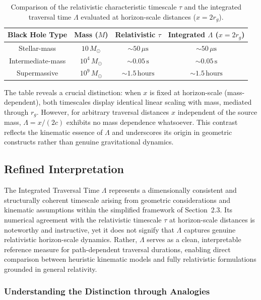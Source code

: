 \documentclass[12pt,a4paper]{article}
\begin{document}
\begin{table}[h!]
\centering
\begin{tabular}{|c|c|c|c|}
\hline
\textbf{Black Hole Type} & \textbf{Mass ($M$)} & \textbf{Relativistic $\tau$} & \textbf{Integrated $\Lambda$ ($x = 2r_g$)} \\
\hline
Stellar-mass & $10\,M_\odot$ & $\sim 50\,\mu\text{s}$ & $\sim 50\,\mu\text{s}$ \\
Intermediate-mass & $10^4\,M_\odot$ & $\sim 0.05\,\text{s}$ & $\sim 0.05\,\text{s}$ \\
Supermassive & $10^9\,M_\odot$ & $\sim 1.5\,\text{hours}$ & $\sim 1.5\,\text{hours}$ \\
\hline
\end{tabular}
\caption{Comparison of the relativistic characteristic timescale $\tau$ and the integrated traversal time $\Lambda$ evaluated at horizon-scale distances ($x = 2r_g$).}
\label{table:timescales}
\end{table}

The table reveals a crucial distinction: when $x$ is fixed at horizon-scale (mass-dependent), both timescales display identical linear scaling with mass, mediated through $r_g$. However, for arbitrary traversal distances $x$ independent of the source mass, $\Lambda = x/(2c)$ exhibits no mass dependence whatsoever. This contrast reflects the kinematic essence of $\Lambda$ and underscores its origin in geometric constructs rather than genuine gravitational dynamics.

\subsection{Refined Interpretation}

The Integrated Traversal Time $\Lambda$ represents a dimensionally consistent and structurally coherent timescale arising from geometric considerations and kinematic assumptions within the simplified framework of Section~2.3. Its numerical agreement with the relativistic timescale $\tau$ at horizon-scale distances is noteworthy and instructive, yet it does not signify that $\Lambda$ captures genuine relativistic horizon-scale dynamics. Rather, $\Lambda$ serves as a clean, interpretable reference measure for path-dependent traversal durations, enabling direct comparison between heuristic kinematic models and fully relativistic formulations grounded in general relativity.

\subsubsection{Understanding the Distinction through Analogies}
\end{document}
